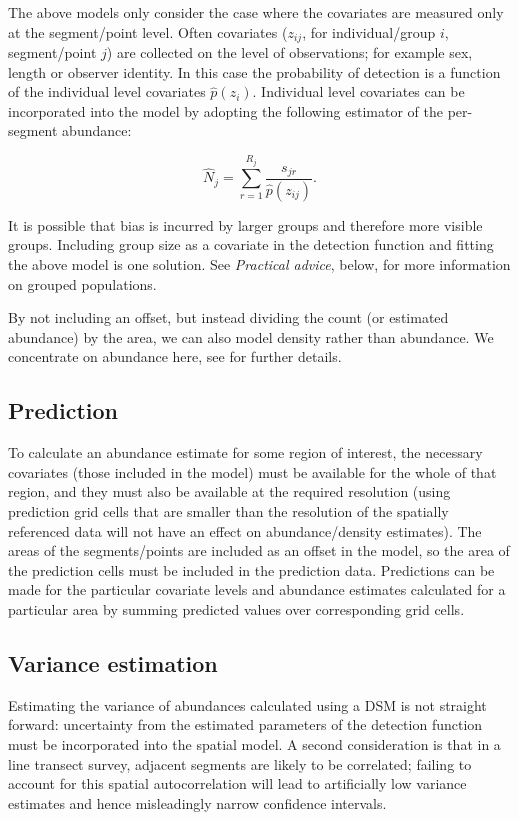 \documentclass[a4paper,12pt]{article}
\begin{document}
The above models only consider the case where the covariates are measured only at the segment/point level. Often covariates ($z_{ij}$, for individual/group $i$, segment/point $j$) are collected on the level of observations; for example sex, length or observer identity. In this case the probability of detection is a function of the individual level covariates $\hat{p}(z_i)$. Individual level covariates can be incorporated into the model by adopting the following estimator of the per-segment abundance:

\begin{equation*}
\hat{N}_j = \sum_{r=1}^{R_j} \frac{s_{jr}}{\hat{p}(z_{ij})}.
\end{equation*}

It is possible that bias is incurred by larger groups and therefore more visible groups. Including group size as a covariate in the detection function and fitting the above model is one solution. See \textit{Practical advice}, below, for more information on grouped populations.

By not including an offset, but instead dividing the count (or estimated abundance) by the area, we can also model density rather than abundance. We concentrate on abundance here, see \cite{Hedley:2004et} for further details.

\subsection*{Prediction}

To calculate an abundance estimate for some region of interest, the necessary covariates (those included in the model) must be available for the whole of that region, and they must also be available at the required resolution (using prediction grid cells that are smaller than the resolution of the spatially referenced data will not have an effect on abundance/density estimates). The areas of the segments/points are included as an offset in the model, so the area of the prediction cells must be included in the prediction data. Predictions can be made for the particular covariate levels and abundance estimates calculated for a particular area by summing predicted values over corresponding grid cells. 


\subsection*{Variance estimation}

Estimating the variance of abundances calculated using a DSM is not straight forward: uncertainty from the estimated parameters of the detection function must be incorporated into the spatial model. A second consideration is that in a line transect survey, adjacent segments are likely to be correlated; failing to account for this spatial autocorrelation will lead to artificially low variance estimates and hence misleadingly narrow confidence intervals.
\end{document}
